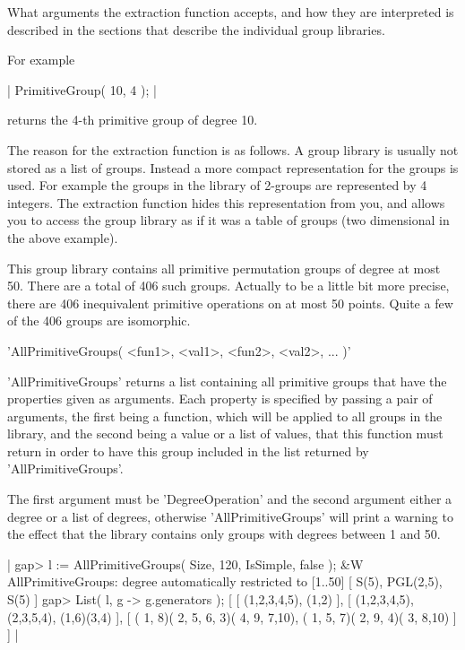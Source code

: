 What  arguments  the  extraction  function  accepts,  and  how  they  are
interpreted is described in the  sections  that  describe  the individual
group libraries.

For example

|    PrimitiveGroup( 10, 4 ); |

returns the 4-th primitive group of degree 10.

The reason for the extraction function is as follows.  A group library is
usually  not  stored  as  a  list  of  groups.   Instead a  more  compact
representation for  the groups is used.   For  example  the groups in the
library  of  2-groups are  represented  by 4  integers.   The  extraction
function hides this representation from you, and allows you to access the
group library  as  if it was  a  table of groups  (two dimensional in the
above example).

\newpage
{}

This group library contains all primitive permutation groups of degree at
most 50.  There are a total of 406 such groups.   Actually to be a little
bit more precise,  there are 406  inequivalent primitive operations on at
most 50 points.  Quite a few of the 406 groups are isomorphic.

\vspace{5mm}
'AllPrimitiveGroups( <fun1>, <val1>, <fun2>, <val2>, ... )'%

'AllPrimitiveGroups' returns a list containing all primitive groups  that
have  the properties given  as arguments.  Each property  is specified by
passing a  pair of  arguments, the first being a function,  which will be
applied to all  groups in the library,  and the second being a value or a
list of values,  that  this  function must return in order to  have  this
group included in the list returned by 'AllPrimitiveGroups'.

The  first argument must  be  'DegreeOperation'  and the  second argument
either a degree or a list of degrees, otherwise 'AllPrimitiveGroups' will
print a warning to the effect that the library  contains only groups with
degrees between 1 and 50.

|    gap> l := AllPrimitiveGroups( Size, 120, IsSimple, false );
    &W  AllPrimitiveGroups: degree automatically restricted to [1..50]
    [ S(5), PGL(2,5), S(5) ]
    gap> List( l, g -> g.generators );
    [ [ (1,2,3,4,5), (1,2) ], [ (1,2,3,4,5), (2,3,5,4), (1,6)(3,4) ],
      [ ( 1, 8)( 2, 5, 6, 3)( 4, 9, 7,10), ( 1, 5, 7)( 2, 9, 4)( 3, 8,10)
         ] ] |

